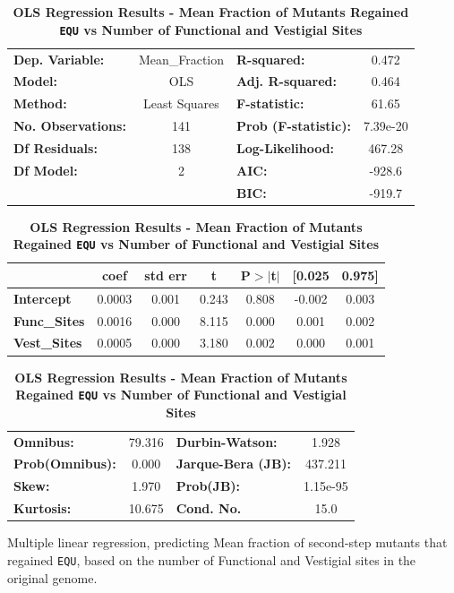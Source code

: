 \documentclass[10pt,letterpaper,final]{article}
\begin{document}
	\begin{table}[h]
	\centering
	\caption{\textbf{OLS Regression Results - Mean Fraction of Mutants Regained \texttt{EQU} vs Number of Functional and Vestigial Sites}}
	\label{ce-olsregression-2ndstep-h}
	\begin{tabular}{lclc}
	\toprule
	\textbf{Dep. Variable:}    &  Mean\_Fraction  & \textbf{  R-squared:         } &     0.472   \\
	\textbf{Model:}            &       OLS        & \textbf{  Adj. R-squared:    } &     0.464   \\
	\textbf{Method:}           &  Least Squares   & \textbf{  F-statistic:       } &     61.65   \\
	\textbf{No. Observations:} &         141      & \textbf{  Prob (F-statistic):} &  7.39e-20   \\
	\textbf{Df Residuals:}     &         138      & \textbf{  Log-Likelihood:    } &    467.28   \\
	\textbf{Df Model:}         &           2      & \textbf{  AIC:               } &    -928.6   \\
	                           &                  & \textbf{  BIC:               } &    -919.7   \\
	\bottomrule
	\end{tabular}
	\begin{tabular}{lcccccc}
	                     & \textbf{coef} & \textbf{std err} & \textbf{t} & \textbf{P$>$$|$t$|$} & \textbf{[0.025} & \textbf{0.975]}  \\
	\midrule
	\textbf{Intercept}   &       0.0003  &        0.001     &     0.243  &         0.808        &       -0.002    &        0.003     \\
	\textbf{Func\_Sites} &       0.0016  &        0.000     &     8.115  &         0.000        &        0.001    &        0.002     \\
	\textbf{Vest\_Sites} &       0.0005  &        0.000     &     3.180  &         0.002        &        0.000    &        0.001     \\
	\bottomrule
	\end{tabular}
	\begin{tabular}{lclc}
	\textbf{Omnibus:}       & 79.316 & \textbf{  Durbin-Watson:     } &    1.928  \\
	\textbf{Prob(Omnibus):} &  0.000 & \textbf{  Jarque-Bera (JB):  } &  437.211  \\
	\textbf{Skew:}          &  1.970 & \textbf{  Prob(JB):          } & 1.15e-95  \\
	\textbf{Kurtosis:}      & 10.675 & \textbf{  Cond. No.          } &     15.0  \\
	\bottomrule
	\end{tabular}
	\begin{flushleft}Multiple linear regression, predicting Mean fraction of second-step mutants that regained \texttt{EQU}, based on the number of Functional and Vestigial sites in the original genome.  
	\end{flushleft}
	\label{ce-olsregression-2ndstep}
	\end{table}
\end{document}

